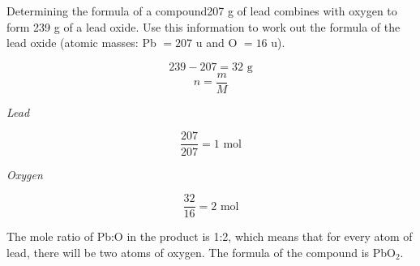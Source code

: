 \begin{wex}{Determining the formula of a compound}{207 g of lead combines with oxygen to form 239 g of a lead oxide. Use this information to work out the formula of the lead oxide (atomic masses: Pb $= 207$ u and O $= 16$ u).}{
\begin{equation*}
239 - 207 = 32 \text{ g}
\end{equation*}
\begin{equation*}
n = \frac{m}{M}
\end{equation*}

\textit{Lead}

\begin{equation*}
\frac{207}{207} = 1 \text{ mol}
\end{equation*}

\textit{Oxygen}

\begin{equation*}
\frac{32}{16} = 2 \text{ mol}
\end{equation*}

The mole ratio of Pb:O in the product is 1:2, which means that for every atom of lead, there will be two atoms of oxygen. The formula of the compound is PbO$_{2}$.
}
\end{wex}

